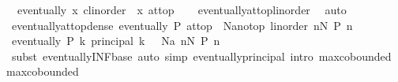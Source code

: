 \begin{isabellebody}
\ \ {\isachardoublequoteopen}eventually\ {\isacharparenleft}{\kern0pt}{\isasymlambda}x{\isachardot}{\kern0pt}\ {\isacharparenleft}{\kern0pt}c{\isacharcolon}{\kern0pt}{\isacharcolon}{\kern0pt}{\isacharunderscore}{\kern0pt}{\isacharcolon}{\kern0pt}{\isacharcolon}{\kern0pt}linorder{\isacharparenright}{\kern0pt}\ {\isasymle}\ x{\isacharparenright}{\kern0pt}\ at{\isacharunderscore}{\kern0pt}top{\isachardoublequoteclose}\isanewline
%
\isadelimproof
\ \ %
\endisadelimproof
%
\isatagproof
{}\isamarkupfalse%
\ eventually{\isacharunderscore}{\kern0pt}at{\isacharunderscore}{\kern0pt}top{\isacharunderscore}{\kern0pt}linorder\ \isamarkupfalse%
\ auto%
\endisatagproof
{\isafoldproof}%
%
\isadelimproof
\isanewline
%
\endisadelimproof
\isanewline
{}\isamarkupfalse%
\ eventually{\isacharunderscore}{\kern0pt}at{\isacharunderscore}{\kern0pt}top{\isacharunderscore}{\kern0pt}dense{\isacharcolon}{\kern0pt}\ {\isachardoublequoteopen}eventually\ P\ at{\isacharunderscore}{\kern0pt}top\ {\isasymlongleftrightarrow}\ {\isacharparenleft}{\kern0pt}{\isasymexists}N{\isacharcolon}{\kern0pt}{\isacharcolon}{\kern0pt}{\isacharprime}{\kern0pt}a{\isacharcolon}{\kern0pt}{\isacharcolon}{\kern0pt}{\isacharbraceleft}{\kern0pt}no{\isacharunderscore}{\kern0pt}top{\isacharcomma}{\kern0pt}\ linorder{\isacharbraceright}{\kern0pt}{\isachardot}{\kern0pt}\ {\isasymforall}n{\isachargreater}{\kern0pt}N{\isachardot}{\kern0pt}\ P\ n{\isacharparenright}{\kern0pt}{\isachardoublequoteclose}\isanewline
%
\isadelimproof
%
\endisadelimproof
%
\isatagproof
{}\isamarkupfalse%
\ {\isacharminus}{\kern0pt}\isanewline
\ \ \isamarkupfalse%
\ {\isachardoublequoteopen}eventually\ P\ {\isacharparenleft}{\kern0pt}{\isasymSqinter}k{\isachardot}{\kern0pt}\ principal\ {\isacharbraceleft}{\kern0pt}k\ {\isacharless}{\kern0pt}{\isachardot}{\kern0pt}{\isachardot}{\kern0pt}{\isacharbraceright}{\kern0pt}{\isacharparenright}{\kern0pt}\ {\isasymlongleftrightarrow}\ {\isacharparenleft}{\kern0pt}{\isasymexists}N{\isacharcolon}{\kern0pt}{\isacharcolon}{\kern0pt}{\isacharprime}{\kern0pt}a{\isachardot}{\kern0pt}\ {\isasymforall}n{\isachargreater}{\kern0pt}N{\isachardot}{\kern0pt}\ P\ n{\isacharparenright}{\kern0pt}{\isachardoublequoteclose}\isanewline
\ \ \ \ \isamarkupfalse%
\ {\isacharparenleft}{\kern0pt}subst\ eventually{\isacharunderscore}{\kern0pt}INF{\isacharunderscore}{\kern0pt}base{\isacharparenright}{\kern0pt}\ {\isacharparenleft}{\kern0pt}auto\ simp{\isacharcolon}{\kern0pt}\ eventually{\isacharunderscore}{\kern0pt}principal\ intro{\isacharcolon}{\kern0pt}\ max{\isachardot}{\kern0pt}cobounded{}\ max{\isachardot}{\kern0pt}cobounded{}{\isacharparenright}{\kern0pt}\isanewline

\end{isabellebody}
